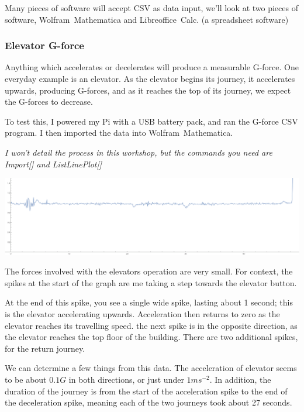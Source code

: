 \documentclass[a4paper, twocolumn, twoside, 12pt]{article}
\begin{document}
		Many pieces of software will accept CSV as data input, we'll look at two pieces of software, \mbox{Wolfram Mathematica} and \mbox{Libreoffice Calc}. (a spreadsheet software)
		
		\iffalse
		
		\subsubsection*{Elevator G-force}
		
		Anything which accelerates or decelerates will produce a measurable G-force. One everyday example is an elevator. As the elevator begins its journey, it accelerates upwards, producing G-forces, and as it reaches the top of its journey, we expect the G-forces to decrease.
		
		To test this, I powered my Pi with a USB battery pack, and ran the G-force CSV program. I then imported the data into \mbox{Wolfram Mathematica}.
		
		\textit{I won't detail the process in this workshop, but the commands you need are Import[] and \mbox{ListLinePlot[]}}
		
		\begin{center}
			\includegraphics[width=1\linewidth]{img/Results_Mathematica}
		\end{center}
		
		The forces involved with the elevators operation are very small. For context, the spikes at the start of the graph are me taking a step towards the elevator button.
		
		At the end of this spike, you see a single wide spike, lasting about 1 second; this is the elevator accelerating upwards. Acceleration then returns to zero as the elevator reaches its travelling speed. the next spike is in the opposite direction, as the elevator reaches the top floor of the building. There are two additional spikes, for the return journey.
		
		We can determine a few things from this data. The acceleration of elevator seems to be about $0.1G$ in both directions, or just under $1ms^{-2}$. In addition, the duration of the journey is from the start of the acceleration spike to the end of the deceleration spike, meaning each of the two journeys took about 27 seconds.
		
\end{document}
